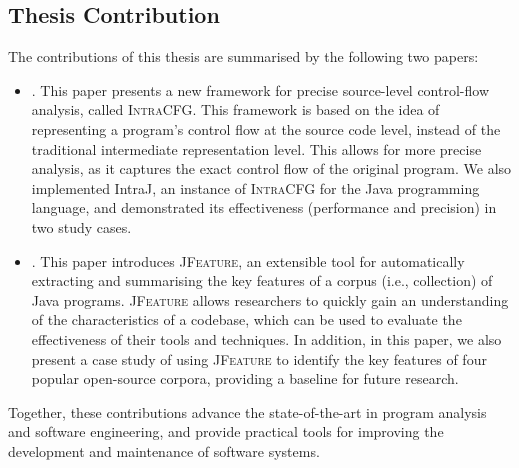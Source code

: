 \subsection*{Thesis Contribution}

The contributions of this thesis are summarised by the following two papers:

\begin{itemize}
	\item \paperIref.
	This paper presents a new framework for precise source-level control-flow 
	analysis, called \textsc{IntraCFG}. This framework is based on the idea of 
	representing a program's control flow at the source code level, instead of 
	the traditional intermediate representation level. This allows for more 
	precise analysis, as it captures the exact control flow of the original program.
    We also implemented IntraJ, an instance of \textsc{IntraCFG} for the Java programming 
	language, and demonstrated its effectiveness (performance and precision) in 
	two study cases.

	\item \paperIIref.
	This paper introduces \textsc{JFeature}, an extensible tool for automatically extracting and summarising
	the key features of a corpus (i.e., collection) of Java programs. \textsc{JFeature} 
	allows researchers to quickly gain an understanding of the characteristics of a codebase, 
	which can be used to evaluate the effectiveness of their tools and techniques.
	In addition, in this paper, we also present a case study of using \textsc{JFeature} to
	identify the key features of four popular open-source corpora, providing a
	baseline for future research.
\end{itemize}

Together, these contributions advance the state-of-the-art in program analysis 
and software engineering, and provide practical tools for improving the development
and maintenance of software systems.
